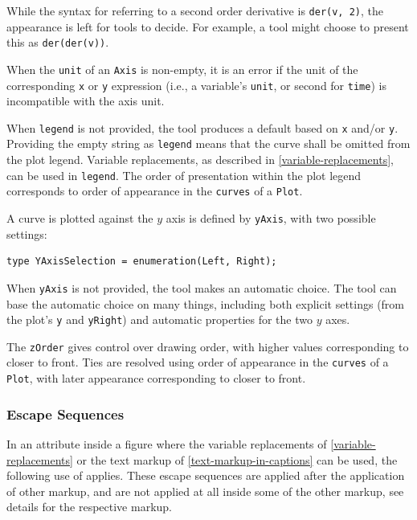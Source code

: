 \begin{nonnormative}
While the syntax for referring to a second order derivative is \lstinline!der(v, 2)!, the appearance is left for tools to decide.
For example, a tool might choose to present this as \lstinline!der(der(v))!.
\end{nonnormative}

When the \lstinline!unit! of an \lstinline!Axis! is non-empty, it is an error if the unit of the corresponding \lstinline!x! or \lstinline!y! expression (i.e., a variable's \lstinline!unit!, or second for \lstinline!time!) is incompatible with the axis unit.

When \lstinline!legend! is not provided, the tool produces a default based on \lstinline!x! and/or \lstinline!y!.
Providing the empty string as \lstinline!legend! means that the curve shall be omitted from the plot legend.
Variable replacements, as described in \cref{variable-replacements}, can be used in \lstinline!legend!.
The order of presentation within the plot legend corresponds to order of appearance in the \lstinline!curves! of a \lstinline!Plot!.

A curve is plotted against the $y$ axis is defined by \lstinline!yAxis!, with two possible settings:
\begin{lstlisting}[language=modelica]
type YAxisSelection = enumeration(Left, Right);
\end{lstlisting}%
When \lstinline!yAxis! is not provided, the tool makes an automatic choice.
The tool can base the automatic choice on many things, including both explicit settings (from the plot's \lstinline!y! and \lstinline!yRight!) and automatic properties for the two $y$ axes.

The \lstinline!zOrder! gives control over drawing order, with higher values corresponding to closer to front.
Ties are resolved using order of appearance in the \lstinline!curves! of a \lstinline!Plot!, with later appearance corresponding to closer to front.

\subsubsection{Escape Sequences}\label{text-markup-escape-sequences}

In an attribute inside a figure where the variable replacements of \cref{variable-replacements} or the text markup of \cref{text-markup-in-captions} can be used, the following use of  applies.
These escape sequences are applied after the application of other markup, and are not applied at all inside some of the other markup, see details for the respective markup.

